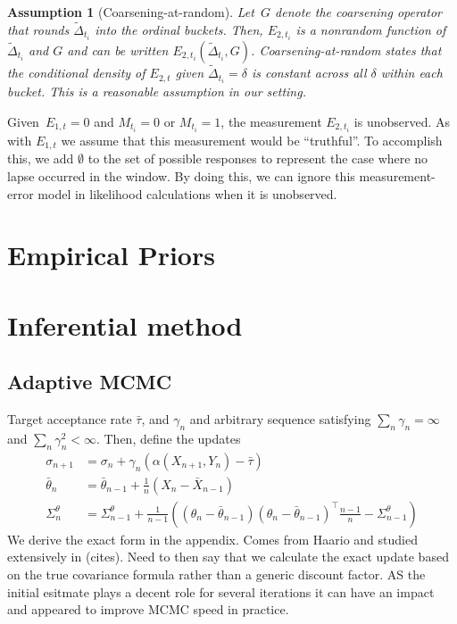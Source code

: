 \documentclass[11pt]{amsart}
\newtheorem{assumption}[thm]{Assumption}
\begin{document}
\begin{assumption}[Coarsening-at-random] \normalfont
Let~$G$ denote the coarsening operator that rounds $\tilde
\Delta_{t_i}$ into the ordinal buckets.
Then, $E_{2,t_i}$ is a nonrandom function of $\tilde \Delta_{t_i}$
and $G$ and can be written $E_{2,t_i} (\tilde \Delta_{t_i}, G)$.
\emph{Coarsening-at-random} states that the conditional density of
$E_{2,t}$ given $\tilde \Delta_{t_i} = \delta$ is constant across all
$\delta$ within each bucket.
This is a reasonable assumption in our setting.
\end{assumption}

Given~$E_{1,t} = 0$ and $M_{t_i} = 0$ or $M_{t_i} = 1$, the
measurement $E_{2,t_i}$ is unobserved.  As with $E_{1,t}$ we assume
that this measurement would be ``truthful''.  To accomplish this, we
add $\emptyset$ to the set of possible responses to represent the case
where no lapse occurred in the window.
By doing this, we can ignore this measurement-error model in
likelihood calculations when it is unobserved.

\section{Empirical Priors}

\section{Inferential method}

\subsection{Adaptive MCMC}

Target acceptance rate $\bar \tau$, and $\gamma_n$ and arbitrary sequence satisfying $\sum_n \gamma_n = \infty$ and $\sum_n \gamma_n^2 < \infty$.  Then, define the updates
$$
\begin{aligned}
\sigma_{n+1} &= \sigma_n + \gamma_n \left( \alpha(X_{n+1}, Y_n) - \bar \tau \right) \\
\bar \theta_n &= \bar \theta_{n-1} + \frac{1}{n} \left( X_n - \bar X_{n-1} \right) \\
\Sigma_n^\theta &= \Sigma_{n-1}^{\theta}  + \frac{1}{n-1} \left( (\theta_n - \bar \theta_{n-1}) (\theta_n - \bar \theta_{n-1})^\top \frac{n-1}{n} - \Sigma_{n-1}^\theta \right)
\end{aligned}
$$
We derive the exact form in the appendix.  Comes from Haario and studied extensively in (cites).  Need to then say that we calculate the exact update based on the true covariance formula rather than a generic discount factor.  AS the initial esitmate plays a decent role for several iterations it can have an impact and appeared to improve MCMC speed in practice.
\end{document}
